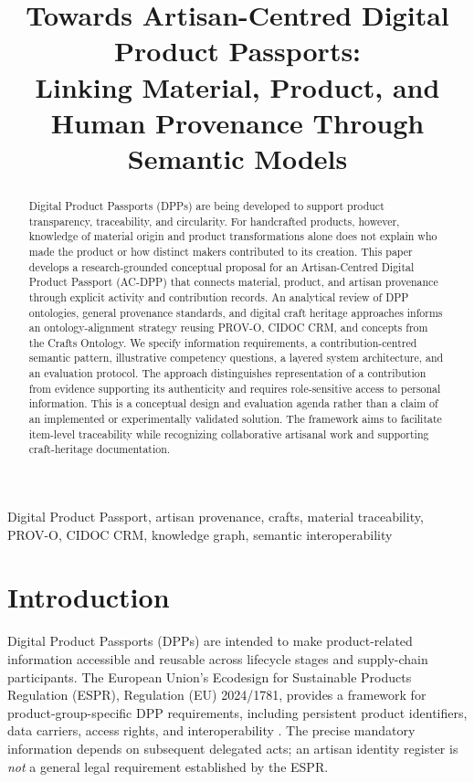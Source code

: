 \documentclass[conference]{IEEEtran}
\begin{document}
\title{Towards Artisan-Centred Digital Product Passports:\\ Linking Material, Product, and Human Provenance Through Semantic Models}
\author{}
\maketitle
\begin{abstract}
Digital Product Passports (DPPs) are being developed to support product transparency, traceability, and circularity. For handcrafted products, however, knowledge of material origin and product transformations alone does not explain who made the product or how distinct makers contributed to its creation. This paper develops a research-grounded conceptual proposal for an Artisan-Centred Digital Product Passport (AC-DPP) that connects material, product, and artisan provenance through explicit activity and contribution records. An analytical review of DPP ontologies, general provenance standards, and digital craft heritage approaches informs an ontology-alignment strategy reusing PROV-O, CIDOC CRM, and concepts from the Crafts Ontology. We specify information requirements, a contribution-centred semantic pattern, illustrative competency questions, a layered system architecture, and an evaluation protocol. The approach distinguishes representation of a contribution from evidence supporting its authenticity and requires role-sensitive access to personal information. This is a conceptual design and evaluation agenda rather than a claim of an implemented or experimentally validated solution. The framework aims to facilitate item-level traceability while recognizing collaborative artisanal work and supporting craft-heritage documentation.
\end{abstract}
\begin{IEEEkeywords}
Digital Product Passport, artisan provenance, crafts, material traceability, PROV-O, CIDOC CRM, knowledge graph, semantic interoperability
\end{IEEEkeywords}

\section{Introduction}
Digital Product Passports (DPPs) are intended to make product-related information accessible and reusable across lifecycle stages and supply-chain participants. The European Union's Ecodesign for Sustainable Products Regulation (ESPR), Regulation (EU) 2024/1781, provides a framework for product-group-specific DPP requirements, including persistent product identifiers, data carriers, access rights, and interoperability \cite{eu2024espr}. The precise mandatory information depends on subsequent delegated acts; an artisan identity register is \emph{not} a general legal requirement established by the ESPR.
\end{document}
